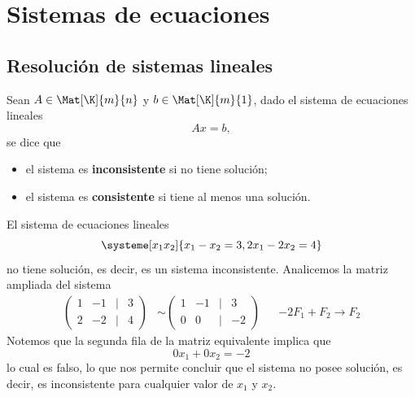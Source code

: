 \documentclass[compacto,10pt]{pubciencias-notas}
\begin{document}
\encabezado

\vspace*{-8mm}

\setcounter{section}{1}
\section{Sistemas de ecuaciones}
\setcounter{subsection}{1}
\subsection{Resolución de sistemas lineales}

\begin{defi}
    Sean $A\in \Mat[\K]{m}{n}$ y $b\in \Mat[\K]{m}{1}$, dado el sistema de ecuaciones lineales
    \[
        Ax=b,
    \]
    se dice que
    \begin{itemize}
    \item
        el sistema es \textbf{inconsistente} si no tiene solución;
    \item
        el sistema es \textbf{consistente} si tiene al menos una solución.
    \end{itemize}
\end{defi}

\begin{ejem}\hspace{0pt} 
El sistema de ecuaciones lineales
\[
    \systeme[x_1 x_2]{x_1 -x_2 = 3,
        2x_1 -2x_2 = 4}
\]
no tiene solución, es decir, es un sistema inconsistente. Analicemos la matriz ampliada del sistema
\begin{align*}
    \begin{pmatrix}
    1&-1&|&3\\
    2&-2&|&4
    \end{pmatrix}
    &\sim
    \begin{pmatrix}
    1&-1&|&3\\
    0&0&|&-2
    \end{pmatrix} 
    && -2F_{1} + F_{2} \to F_{2}
\end{align*}
Notemos que la segunda fila de la matriz equivalente implica que
\[
    0x_{1} + 0x_{2} = -2
\]
lo cual es falso, lo que nos permite concluir que el sistema no posee solución, es decir, es inconsistente para cualquier valor de $x_{1}$ y $x_{2}$.
\end{ejem}
\end{document}
